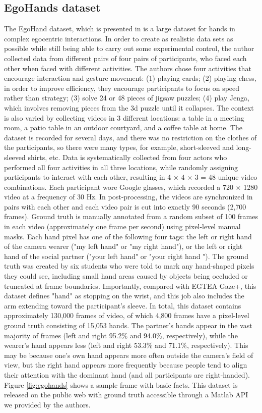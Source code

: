\subsection{EgoHands dataset}
The EgoHand dataset, which is presented in \cite{10.1109/ICCV.2015.226} is a large dataset for hands in complex egocentric interactions. In order to create as realistic data sets as possible while still being able to carry out some experimental control, the author collected data from different pairs of four pairs of participants, who faced each other when faced with different activities. The authors chose four activities that encourage interaction and gesture movement: (1) playing cards; (2) playing chess, in order to improve efficiency, they encourage participants to focus on speed rather than strategy; (3) solve 24 or 48 pieces of jigsaw puzzles; (4) play Jenga, which involves removing pieces from the 3d puzzle until it collapses. The context is also varied by collecting videos in 3 different locations: a table in a meeting room, a patio table in an outdoor courtyard, and a coffee table at home. The dataset is recorded for several days, and there was no restriction on the clothes of the participants, so there were many types, for example, short-sleeved and long-sleeved shirts, etc. Data is systematically collected from four actors who performed all four activities in all three locations, while randomly assigning participants to interact with each other, resulting in 4 × 4 × 3 = 48 unique video combinations. Each participant wore Google glasses, which recorded a 720 × 1280 video at a frequency of 30 Hz. In post-processing, the videos are synchronized in pairs with each other and each video pair is cut into exactly 90 seconds (2,700 frames). Ground truth is manually annotated from a random subset of 100 frames in each video (approximately one frame per second) using pixel-level manual masks. Each hand pixel has one of the following four tags: the left or right hand of the camera wearer ("my left hand" or "my right hand"), or the left or right hand of the social partner ("your left hand" or "your right hand "). The ground truth was created by six students who were told to mark any hand-shaped pixels they could see, including small hand areas caused by objects being occluded or truncated at frame boundaries. Importantly, compared with EGTEA Gaze+, this dataset defines "hand" as stopping on the wrist, and this job also includes the arm extending toward the participant's sleeve. In total, this dataset contains approximately 130,000 frames of video, of which 4,800 frames have a pixel-level ground truth consisting of 15,053 hands. The partner's hands appear in the vast majority of frames (left and right 95.2\% and 94.0\%, respectively), while the wearer's hand appears less (left and right 53.3\% and 71.1\%, respectively). This may be because one's own hand appears more often outside the camera's field of view, but the right hand appears more frequently because people tend to align their attention with the dominant hand (and all participants are right-handed). Figure \ref{fig:egohands} shows a sample frame with basic facts. This dataset is released on the public web with ground truth accessible through a Matlab API we provided by the authors.
